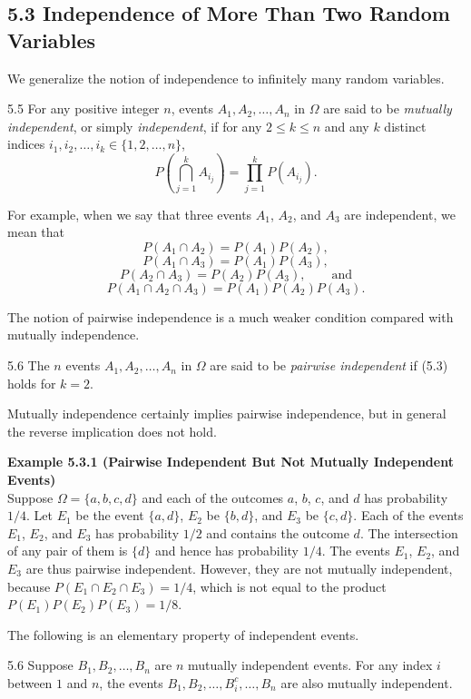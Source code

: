 \subsection*{5.3 Independence of More Than Two Random Variables}

We generalize the notion of independence to infinitely many random variables.

\begin{defbox}{5.5}
For any positive integer $n$, events $A_1,A_2,\ldots,A_n$ in $\Omega$ are said to be \textit{mutually independent}, or simply \textit{independent}, if for any $2 \le k \le n$ and any $k$ distinct indices $i_1,i_2,\ldots,i_k \in \{1,2,\ldots,n\}$,
\[
P\left(\bigcap_{j=1}^{k} A_{i_j}\right)=\prod_{j=1}^{k} P(A_{i_j}).
\tag{5.3}
\]
\end{defbox}

For example, when we say that three events $A_1$, $A_2$, and $A_3$ are independent, we mean that
\[
P(A_1 \cap A_2)=P(A_1)P(A_2),
\]
\[
P(A_1 \cap A_3)=P(A_1)P(A_3),
\]
\[
P(A_2 \cap A_3)=P(A_2)P(A_3), \qquad \text{and}
\]
\[
P(A_1 \cap A_2 \cap A_3)=P(A_1)P(A_2)P(A_3).
\]

The notion of pairwise independence is a much weaker condition compared with mutually independence.

\begin{defbox}{5.6}
The $n$ events $A_1,A_2,\ldots,A_n$ in $\Omega$ are said to be \textit{pairwise independent} if (5.3) holds for $k=2$.
\end{defbox}

Mutually independence certainly implies pairwise independence, but in general the reverse implication does not hold.

\textbf{Example 5.3.1 (Pairwise Independent But Not Mutually Independent Events)} \\
Suppose $\Omega=\{a,b,c,d\}$ and each of the outcomes $a$, $b$, $c$, and $d$ has probability $1/4$. Let $E_1$ be the event $\{a,d\}$, $E_2$ be $\{b,d\}$, and $E_3$ be $\{c,d\}$. Each of the events $E_1$, $E_2$, and $E_3$ has probability $1/2$ and contains the outcome $d$. The intersection of any pair of them is $\{d\}$ and hence has probability $1/4$. The events $E_1$, $E_2$, and $E_3$ are thus pairwise independent. However, they are not mutually independent, because $P(E_1 \cap E_2 \cap E_3)=1/4$, which is not equal to the product $P(E_1)P(E_2)P(E_3)=1/8$.

The following is an elementary property of independent events.

\begin{thmbox}{5.6}
Suppose $B_1,B_2,\ldots,B_n$ are $n$ mutually independent events. For any index $i$ between $1$ and $n$, the events $B_1,B_2,\ldots,B_i^c,\ldots,B_n$ are also mutually independent.
\end{thmbox}

